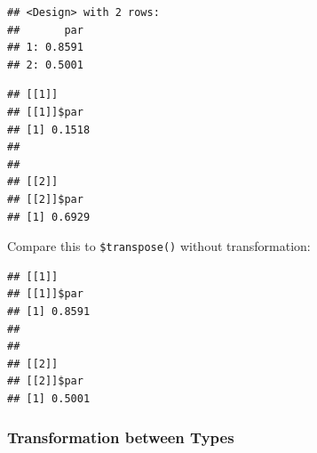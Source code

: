 \documentclass[
]{scrbook}
\newenvironment{Shaded}{\begin{snugshade}}{\end{snugshade}}
\newcommand{\AttributeTok}[1]{\textcolor[rgb]{0.77,0.63,0.00}{#1}}
\newcommand{\CommentTok}[1]{\textcolor[rgb]{0.56,0.35,0.01}{\textit{#1}}}
\newcommand{\ConstantTok}[1]{\textcolor[rgb]{0.00,0.00,0.00}{#1}}
\newcommand{\ControlFlowTok}[1]{\textcolor[rgb]{0.13,0.29,0.53}{\textbf{#1}}}
\newcommand{\DecValTok}[1]{\textcolor[rgb]{0.00,0.00,0.81}{#1}}
\newcommand{\FunctionTok}[1]{\textcolor[rgb]{0.00,0.00,0.00}{#1}}
\newcommand{\NormalTok}[1]{#1}
\newcommand{\OtherTok}[1]{\textcolor[rgb]{0.56,0.35,0.01}{#1}}
\newcommand{\SpecialCharTok}[1]{\textcolor[rgb]{0.00,0.00,0.00}{#1}}
\newcommand{\StringTok}[1]{\textcolor[rgb]{0.31,0.60,0.02}{#1}}
\renewenvironment{Shaded} {\begin{snugshade}\small} {\end{snugshade}}
\begin{document}
\begin{Shaded}
\end{Shaded}

\begin{verbatim}
## <Design> with 2 rows:
##       par
## 1: 0.8591
## 2: 0.5001
\end{verbatim}

\begin{Shaded}
\end{Shaded}

\begin{verbatim}
## [[1]]
## [[1]]$par
## [1] 0.1518
## 
## 
## [[2]]
## [[2]]$par
## [1] 0.6929
\end{verbatim}

Compare this to \texttt{\$transpose()} without transformation:

\begin{Shaded}
\end{Shaded}

\begin{verbatim}
## [[1]]
## [[1]]$par
## [1] 0.8591
## 
## 
## [[2]]
## [[2]]$par
## [1] 0.5001
\end{verbatim}

\hypertarget{transformation-between-types}{%
\subsubsection{Transformation between Types}\label{transformation-between-types}}
\end{document}
